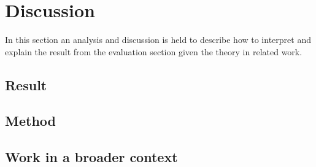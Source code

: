 \section{Discussion}
In this section an analysis and discussion is held to describe how to interpret and explain the result from the evaluation section given the theory in related work.

\subsection{Result} %

\subsection{Method} %

\subsection{Work in a broader context}

